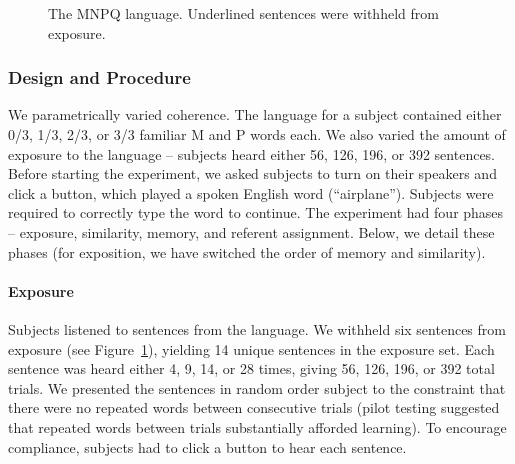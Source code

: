\documentclass[man,floatsintext]{apa6}
\begin{document}
\begin{figure}[t]
  \begin{center}
    \vskip 0.12in 
    \caption{The MNPQ language. Underlined sentences were withheld
      from exposure.}
    \label{mnpq-table}
  \end{center}
\end{figure}

\subsubsection{Design and Procedure}

We parametrically varied coherence. The language for a subject
contained either 0/3, 1/3, 2/3, or 3/3 familiar M and P words each. We
also varied the amount of exposure to the language -- subjects heard
either 56, 126, 196, or 392 sentences. Before starting the experiment,
we asked subjects to turn on their speakers and click a button, which
played a spoken English word (``airplane''). Subjects were required to
correctly type the word to continue. The experiment had four phases --
exposure, similarity, memory, and referent assignment. Below, we
detail these phases (for exposition, we have switched the order of
memory and similarity).

\paragraph{Exposure}
Subjects listened to sentences from the language. We withheld six
sentences from exposure (see Figure~\ref{mnpq-table}), yielding 14
unique sentences in the exposure set. Each sentence was heard either
4, 9, 14, or 28 times, giving 56, 126, 196, or 392 total trials. We
presented the sentences in random order subject to the constraint that
there were no repeated words between consecutive trials (pilot testing
suggested that repeated words between trials substantially afforded
learning). To encourage compliance, subjects had to click a button to
hear each sentence.
\end{document}
